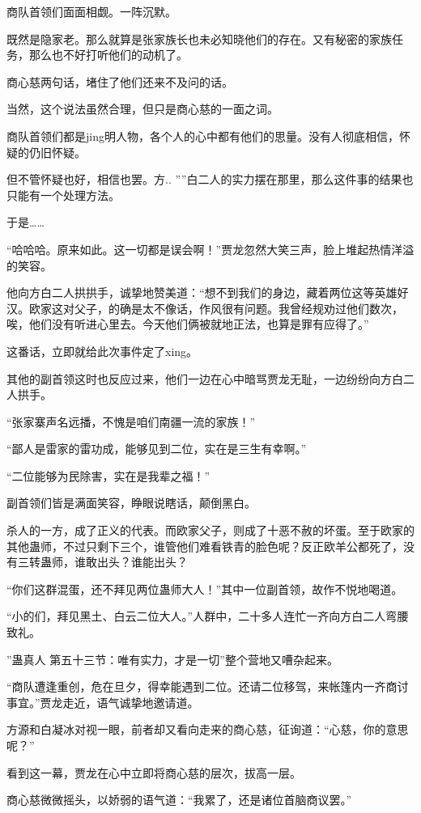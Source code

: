 \begin{this_body}
商队首领们面面相觑。一阵沉默。

既然是隐家老。那么就算是张家族长也未必知晓他们的存在。又有秘密的家族任务，那么也不好打听他们的动机了。

商心慈两句话，堵住了他们还来不及问的话。

当然，这个说法虽然合理，但只是商心慈的一面之词。

商队首领们都是jing明人物，各个人的心中都有他们的思量。没有人彻底相信，怀疑的仍旧怀疑。

但不管怀疑也好，相信也罢。方.. ””白二人的实力摆在那里，那么这件事的结果也只能有一个处理方法。

于是……

“哈哈哈。原来如此。这一切都是误会啊！”贾龙忽然大笑三声，脸上堆起热情洋溢的笑容。

他向方白二人拱拱手，诚挚地赞美道：“想不到我们的身边，藏着两位这等英雄好汉。欧家这对父子，的确是太不像话，作风很有问题。我曾经规劝过他们数次，唉，他们没有听进心里去。今天他们俩被就地正法，也算是罪有应得了。”

这番话，立即就给此次事件定了xing。

其他的副首领这时也反应过来，他们一边在心中暗骂贾龙无耻，一边纷纷向方白二人拱手。

“张家寨声名远播，不愧是咱们南疆一流的家族！”

“鄙人是雷家的雷功成，能够见到二位，实在是三生有幸啊。”

“二位能够为民除害，实在是我辈之福！”

副首领们皆是满面笑容，睁眼说瞎话，颠倒黑白。

杀人的一方，成了正义的代表。而欧家父子，则成了十恶不赦的坏蛋。至于欧家的其他蛊师，不过只剩下三个，谁管他们难看铁青的脸色呢？反正欧羊公都死了，没有三转蛊师，谁敢出头？谁能出头？

“你们这群混蛋，还不拜见两位蛊师大人！”其中一位副首领，故作不悦地喝道。

“小的们，拜见黑土、白云二位大人。”人群中，二十多人连忙一齐向方白二人弯腰致礼。

”蛊真人 第五十三节：唯有实力，才是一切”整个营地又嘈杂起来。

“商队遭逢重创，危在旦夕，得幸能遇到二位。还请二位移驾，来帐篷内一齐商讨事宜。”贾龙走近，语气诚挚地邀请道。

方源和白凝冰对视一眼，前者却又看向走来的商心慈，征询道：“心慈，你的意思呢？”

看到这一幕，贾龙在心中立即将商心慈的层次，拔高一层。

商心慈微微摇头，以娇弱的语气道：“我累了，还是诸位首脑商议罢。”


\end{this_body}
